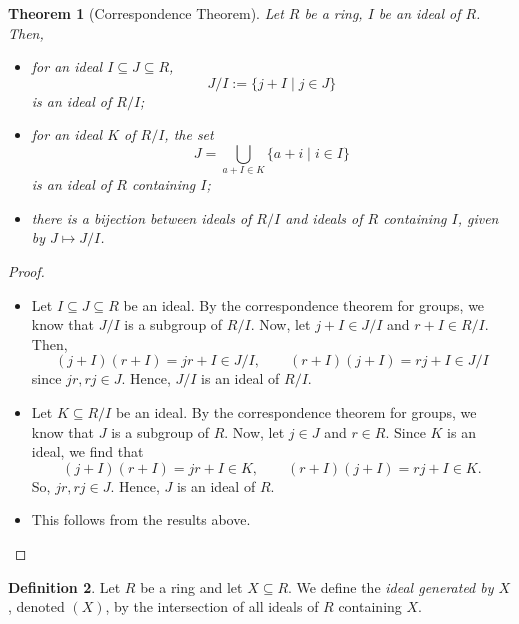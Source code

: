 \documentclass[a4paper, openany]{memoir}
\theoremstyle{definition}
\newtheorem{definition}{Definition}[section]
\theoremstyle{plain}
\newtheorem{theorem}[definition]{Theorem}
\begin{document}
    \begin{theorem}[Correspondence Theorem]
        Let $R$ be a ring, $I$ be an ideal of $R$. Then,
        \begin{itemize}
            \item for an ideal $I \subseteq J \subseteq R$, 
            \[J/I := \{j + I \mid j \in J\}\]
            is an ideal of $R/I$;
            \item for an ideal $K$ of $R/I$, the set
            \[J = \bigcup_{a + I \in K} \{a + i \mid i \in I\}\]
            is an ideal of $R$ containing $I$;
            \item there is a bijection between ideals of $R/I$ and ideals of $R$ containing $I$, given by $J \mapsto J/I$.
        \end{itemize}
    \end{theorem}
    \begin{proof}
        \hspace*{0pt}
        \begin{itemize}
            \item Let $I \subseteq J \subseteq R$ be an ideal. By the correspondence theorem for groups, we know that $J/I$ is a subgroup of $R/I$. Now, let $j + I \in J/I$ and $r + I \in R/I$. Then,
            \[(j + I) (r + I) = jr + I \in J/I, \qquad (r + I) (j + I) = rj + I \in J/I\]
            since $jr, rj \in J$. Hence, $J/I$ is an ideal of $R/I$.

            \item Let $K \subseteq R/I$ be an ideal. By the correspondence theorem for groups, we know that $J$ is a subgroup of $R$. Now, let $j \in J$ and $r \in R$. Since $K$ is an ideal, we find that
            \[(j + I) (r + I) = jr + I \in K, \qquad (r + I)(j + I) = rj + I \in K.\]
            So, $jr, rj \in J$. Hence, $J$ is an ideal of $R$.

            \item This follows from the results above.
        \end{itemize}
    \end{proof}

    \begin{definition}
        Let $R$ be a ring and let $X \subseteq R$. We define the \emph{ideal generated by $X$}, denoted $(X)$, by the intersection of all ideals of $R$ containing $X$.
    \end{definition}
    
\end{document}
